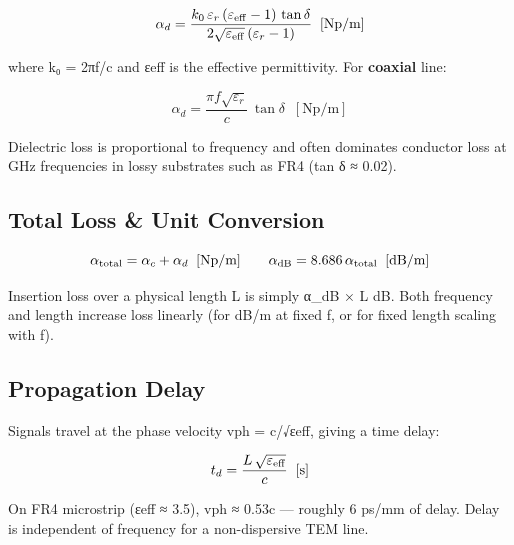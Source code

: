 				
\[\alpha_d = \dfrac{k_0\,\varepsilon_r\,(\varepsilon_{\rm eff}-1)\,\tan\delta}{2\sqrt{\varepsilon_{\rm eff}}\,(\varepsilon_r-1)}\;\;[\text{Np/m}]\]

				

where k₀ = 2πf/c and εeff is the effective permittivity. For \textbf{coaxial} line:

				
\[\alpha_d = \dfrac{\pi f \sqrt{\varepsilon_r}}{c}\,\tan\delta\;\;[\text{Np/m}]\]

				

Dielectric loss is proportional to frequency and often dominates conductor loss at GHz frequencies in lossy substrates such as FR4 (tan δ ≈ 0.02).

				

\subsection{Total Loss \& Unit Conversion}

				
\[\alpha_{\rm total} = \alpha_c + \alpha_d\;\;[\text{Np/m}] \qquad \alpha_{\rm dB} = 8.686\,\alpha_{\rm total}\;\;[\text{dB/m}]\]

				

Insertion loss over a physical length L is simply α\_dB × L dB. Both frequency and length increase loss linearly (for dB/m at fixed f, or for fixed length scaling with f).

				

\subsection{Propagation Delay}

				

Signals travel at the phase velocity vph = c/√εeff, giving a time delay:

				
\[t_d = \dfrac{L\,\sqrt{\varepsilon_{\rm eff}}}{c}\;\;[\text{s}]\]

				

On FR4 microstrip (εeff ≈ 3.5), vph ≈ 0.53c — roughly 6 ps/mm of delay. Delay is independent of frequency for a non-dispersive TEM line.

				
					


					


